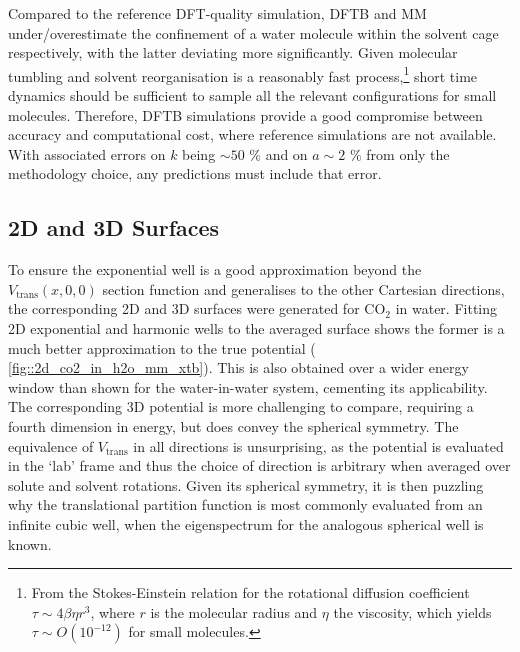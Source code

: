 \documentclass[../main.tex]{subfiles}
\begin{document}
Compared to the reference DFT-quality simulation, DFTB and MM under/overestimate the confinement of a water molecule within the solvent cage respectively, with the latter deviating more significantly. Given molecular tumbling and solvent reorganisation is a reasonably fast process,\footnote{From the Stokes-Einstein relation for the rotational diffusion coefficient $\tau \sim 4\beta\eta r^3$, where $r$ is the molecular radius and $\eta$ the viscosity, which yields $\tau \sim O(10^{-12})$ for small molecules.} short time dynamics should be sufficient to sample all the relevant configurations for small molecules. Therefore, DFTB simulations provide a good compromise between accuracy and computational cost, where reference simulations are not available. With associated errors on $k$ being $\sim 50$ \% and on $a \sim 2$ \% from only the methodology choice, any predictions must include that error.


\subsection{2D and 3D Surfaces}

To ensure the exponential well is a good approximation beyond the $V_\text{trans}(x, 0, 0)$ section function and generalises to the other Cartesian directions, the corresponding 2D and 3D surfaces were generated for CO$_2$ in water. Fitting 2D exponential and harmonic wells to the averaged surface shows the former is a much better approximation to the true potential (\figurename{ \ref{fig::2d_co2_in_h2o_mm_xtb}}). This is also obtained over a wider energy window than shown for the water-in-water system, cementing its applicability. The corresponding 3D potential is more challenging to compare, requiring a fourth dimension in energy, but does convey the spherical symmetry. The equivalence of $V_\text{trans}$ in all directions is unsurprising, as the potential is evaluated in the `lab' frame and thus the choice of direction is arbitrary when averaged over solute and solvent rotations. Given its spherical symmetry, it is then puzzling why the translational partition function is most commonly evaluated from an infinite cubic well, when the eigenspectrum for the analogous spherical well is known.\cite{Huang2016}
\end{document}
